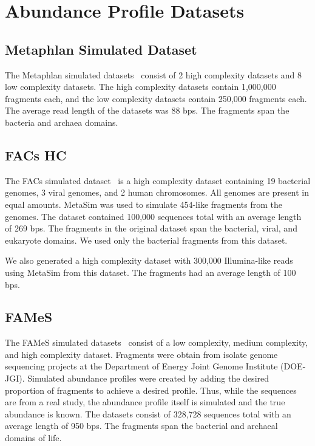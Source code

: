 \section{Abundance Profile Datasets\label{tipp:datasets}}
\subsection{Metaphlan Simulated Dataset}  
The Metaphlan simulated datasets~\cite{Segata2012a} consist of 2 high complexity datasets and 8 low complexity datasets.  The high complexity datasets contain 1,000,000 fragments each, and the low complexity datasets contain 250,000 fragments each.  The average read length of the datasets was 88 bps.  The fragments span the bacteria and archaea domains.

\subsection{FACs HC}  
The FACs simulated dataset~\cite{Stranneheim2010} is a high complexity dataset containing 19 bacterial genomes, 3 viral genomes, and 2 human chromosomes.  All genomes are present in equal amounts.  MetaSim was used to simulate 454-like fragments from the genomes.  The dataset contained 100,000 sequences total with an average length of 269 bps. The fragments in the original dataset span the bacterial, viral, and eukaryote domains.  We used only the bacterial fragments from this dataset.

We also generated a high complexity dataset with 300,000 Illumina-like reads using MetaSim from this dataset.  The fragments had an average length of 100 bps.

\subsection{FAMeS}  
The FAMeS simulated datasets~\cite{Mavromatis2007} consist of a low complexity, medium complexity, and high complexity dataset.  Fragments were obtain from isolate genome sequencing projects at the Department of Energy Joint Genome Institute (DOE-JGI).  Simulated abundance profiles were created by adding the desired proportion of fragments to achieve a desired profile.  Thus, while the sequences are from a real study, the abundance profile itself is simulated and the true abundance is known.  The datasets consist of 328,728 sequences total with an average length of 950 bps.  The fragments span the bacterial and archaeal domains of life. 

